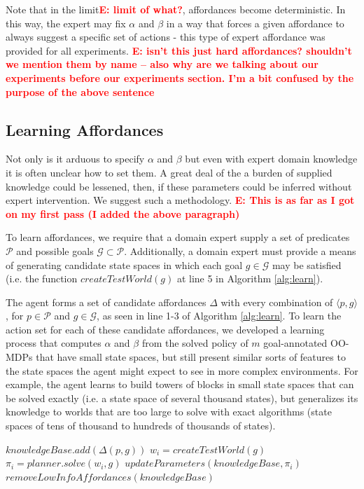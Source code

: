 \documentclass[conference]{IEEEtran}
\newcommand{\enote}[1]{\textcolor{Red}{\textbf{E: #1}}}
\begin{document}
Note that
in the limit\enote{limit of what?}, affordances become deterministic. In this way, the expert may fix $\alpha$ and $\beta$ in a way that forces a given
affordance to always suggest a specific set of actions - this type of expert affordance was provided for all
experiments. \enote{isn't this just hard affordances? shouldn't we mention them by name -- also why are we talking about our experiments before our experiments section. I'm a bit confused by the purpose of the above sentence}

\subsection{Learning Affordances}

Not only is it arduous to specify $\alpha$ and $\beta$ but even with expert domain knowledge it is often unclear how to set them. A great deal of the a burden of supplied knowledge could be lessened, then, if these parameters could be inferred without expert intervention. We suggest such a methodology.
\enote{This is as far as I got on my first pass (I added the above paragraph)}

To learn affordances, we require that a domain expert supply a set of predicates
$\mathcal{P}$ and possible goals $\mathcal{G} \subset \mathcal{P}$. Additionally,
a domain expert must provide a means of generating candidate state spaces in which
each goal $g \in \mathcal{G}$ may be satisfied (i.e. the function $createTestWorld(g)$ at line 5 in Algorithm \ref{alg:learn}).

The agent forms a set of candidate affordances $\Delta$ with every
combination of $\langle p, g \rangle$, for $p \in \mathcal{P}$ and $g
\in \mathcal{G}$, as seen in line 1-3 of Algorithm \ref{alg:learn}. To learn the action set for each of these candidate
affordances, we developed a learning process that computes
$\alpha$ and $\beta$ from the solved policy of $m$ goal-annotated
OO-MDPs that have small state spaces, but still present similar sorts
of features to the state spaces the agent might expect to see in more
complex environments. For example, the agent learns to build towers
of blocks in small state spaces that can be solved exactly (i.e. a state space of several thousand states), but
generalizes its knowledge to worlds that are too large to
solve with exact algorithms (state spaces of tens of thousand to hundreds of thousands of states).

\begin{algorithm}
  \caption{$learn(\mathcal{P}, \mathcal{G})$}
  \begin{algorithmic}[1]
    \State $knowledgeBase.add(\Delta(p,g))$
    \EndFor
    \State $w_i = createTestWorld(g)$
    \State $\pi_i = planner.solve(w_i, g)$
    \State $updateParameters(knowledgeBase, \pi_i)$
    \EndFor
    \State $removeLowInfoAffordances(knowledgeBase)$
  \end{algorithmic}
  \label{alg:learn}
\end{algorithm}
\end{document}
